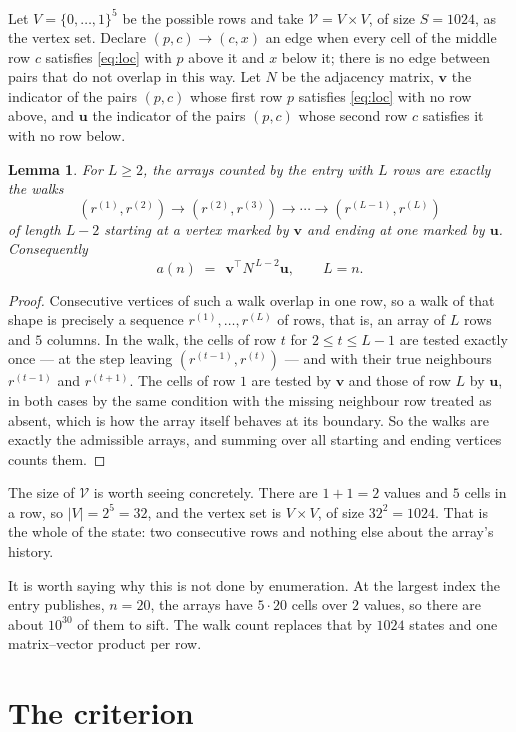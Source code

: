 \documentclass[11pt,a4paper]{article}
\theoremstyle{plain}
\newtheorem{lemma}[theorem]{Lemma}
\theoremstyle{definition}
\begin{document}
Let $V=\{0,\dots,1\}^{5}$ be the possible rows and take
$\mathcal V=V\times V$, of size $S=1024$, as the vertex set. Declare $(p,c)\to(c,x)$ an edge
when every cell of the middle row $c$ satisfies \eqref{eq:loc} with $p$ above it and $x$
below it; there is no edge between pairs that do not overlap in this way. Let $N$ be the
adjacency matrix, $\mathbf{v}$ the indicator of the pairs $(p,c)$ whose first row $p$
satisfies \eqref{eq:loc} with no row above, and $\mathbf{u}$ the indicator of
the pairs $(p,c)$ whose second row $c$ satisfies it with no row below.

\begin{lemma}\label{lem:walk}
For $L\ge2$, the arrays counted by the entry with $L$ rows are exactly the walks
\[
(r^{(1)},r^{(2)})\to(r^{(2)},r^{(3)})\to\cdots\to(r^{(L-1)},r^{(L)})
\]
of length $L-2$ starting at a vertex marked by $\mathbf{v}$ and ending at one marked by
$\mathbf{u}$. Consequently
\[
a(n)\;=\;\,\mathbf{v}^{\!\top}N^{\,L-2}\mathbf{u},\qquad L=n .
\]
\end{lemma}

\begin{proof}
Consecutive vertices of such a walk overlap in one row, so a walk of that shape is
precisely a sequence $r^{(1)},\dots,r^{(L)}$ of rows, that is, an array of $L$ rows
and $5$ columns. In the walk, the cells of row $t$ for $2\le t\le L-1$ are tested
exactly once --- at the step leaving $(r^{(t-1)},r^{(t)})$ --- and with their true
neighbours $r^{(t-1)}$ and $r^{(t+1)}$. The cells of row $1$ are tested by
$\mathbf{v}$ and those of row $L$ by $\mathbf{u}$, in both cases by the same condition
with the missing neighbour row treated as absent, which is how the array itself behaves at
its boundary. So the walks are exactly the admissible arrays, and summing over all starting
and ending vertices counts them.
\end{proof}


The size of $\mathcal V$ is worth seeing concretely. There are $1+1=2$ values
and $5$ cells in a row, so $|V|=2^{5}=32$, and the vertex set is
$V\times V$, of size $32^2=1024$. That is the whole of the state: two consecutive
rows and nothing else about the array's history.

It is worth saying why this is not done by enumeration. At the largest index the entry
publishes, $n=20$, the arrays have $5\cdot20$ cells over
$2$ values, so there are about $10^{30}$ of them to sift. The
walk count replaces that by $1024$ states and one matrix--vector product per row.
\section{The criterion}
\end{document}

